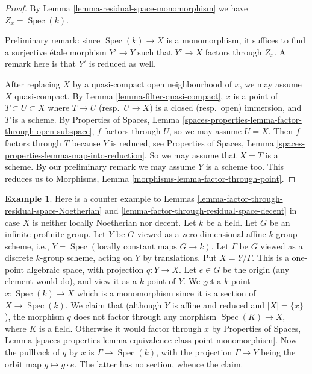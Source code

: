 \documentclass{stacks-project}
\theoremstyle{plain}
\theoremstyle{definition}
\newtheorem{example}[subsection]{Example}
\theoremstyle{remark}
\numberwithin{equation}{subsection}
\def\Spec{\mathop{\mathrm{Spec}}}
\begin{document}
\begin{proof}
By Lemma \ref{lemma-residual-space-monomorphism} we have $Z_x = \Spec(k)$.

\medskip\noindent
Preliminary remark: since $\Spec(k) \to X$ is a monomorphism,
it suffices to find
a surjective \'etale morphism $Y' \to Y$ such that $Y' \to X$
factors through $Z_x$. A remark here is that $Y'$ is reduced as well.

\medskip\noindent
After replacing $X$ by a quasi-compact open neighbourhood of $x$, 
we may assume $X$ quasi-compact. By Lemma \ref{lemma-filter-quasi-compact}, $x$
is a point of $T \subset U \subset X$ where $T \to U$ (resp.\ $U \to X$)
is a closed (resp.\ open) immersion, and $T$ is a scheme.
By Properties of Spaces, Lemma
\ref{spaces-properties-lemma-factor-through-open-subspace},
$f$ factors through $U$, so we may assume $U = X$. Then $f$
factors through $T$ because $Y$ is reduced, see
Properties of Spaces, Lemma \ref{spaces-properties-lemma-map-into-reduction}.
So we may assume that $X = T$ is a scheme.
By our preliminary remark we may assume $Y$ is a scheme too.
This reduces us to Morphisms, Lemma \ref{morphisms-lemma-factor-through-point}.
\end{proof}

\begin{example}
\label{example-does-not-factor-through-residual-gerbe}
Here is a counter example to
Lemmas \ref{lemma-factor-through-residual-space-Noetherian} and
\ref{lemma-factor-through-residual-space-decent}
in case $X$ is neither locally Noetherian nor decent.
Let $k$ be a field. Let $G$ be an infinite profinite group.
Let $Y$ be $G$ viewed as a zero-dimensional affine $k$-group scheme, i.e.,
$Y = \Spec(\text{locally constant maps } G \to k)$.
Let $\Gamma$ be $G$ viewed as a discrete $k$-group scheme,
acting on $Y$ by translations. Put $X = Y/\Gamma$.
This is a one-point algebraic space, with projection $q : Y \to X$.
Let $e \in G$ be the origin (any element would do), and view
it as a $k$-point of $Y$. We get a $k$-point $x : \Spec(k) \to X$
which is a monomorphism since it is a section of $X \to \Spec(k)$.
We claim that (although $Y$ is affine and reduced and $|X| = \{x\}$),
the morphism $q$ does not factor through any morphism $\Spec(K) \to X$,
where $K$ is a field. Otherwise it would factor through
$x$ by Properties of Spaces, Lemma
\ref{spaces-properties-lemma-equivalence-class-point-monomorphism}.
Now the pullback of $q$ by $x$ is $\Gamma \to \Spec(k)$, with
the projection $\Gamma \to Y$ being the orbit map $g \mapsto g \cdot e$.
The latter has no section, whence the claim.
\end{example}
\end{document}
